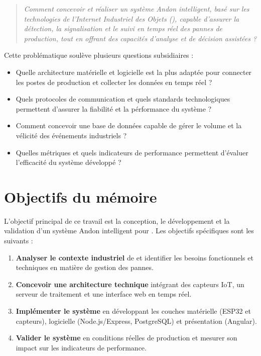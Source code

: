 \begin{quote}
\itshape Comment concevoir et r\'ealiser un syst\`eme Andon intelligent, bas\'e sur les technologies de l'Internet Industriel des Objets (\iiot), capable d'assurer la d\'etection, la signalisation et le suivi en temps r\'eel des pannes de production, tout en offrant des capacit\'es d'analyse et de d\'ecision assist\'ees ?
\end{quote}

Cette probl\'ematique soul\`eve plusieurs questions subsidiaires :
\begin{itemize}
    \item Quelle architecture mat\'erielle et logicielle est la plus adapt\'ee pour connecter les postes de production et collecter les donn\'ees en temps r\'eel ?
    \item Quels protocoles de communication et quels standards technologiques permettent d'assurer la fiabilit\'e et la p\'erformance du syst\`eme ?
    \item Comment concevoir une base de donn\'ees capable de g\'erer le volume et la v\'elicit\'e des \'ev\'enements industriels ?
    \item Quelles m\'etriques et quels indicateurs de performance permettent d'\'evaluer l'efficacit\'e du syst\`eme d\'evelopp\'e ?
\end{itemize}

\section{Objectifs du m\'emoire}

L'objectif principal de ce travail est la conception, le d\'eveloppement et la validation d'un syst\`eme Andon intelligent pour \sews. Les objectifs sp\'ecifiques sont les suivants :

\begin{enumerate}
    \item \textbf{Analyser le contexte industriel} de \sews et identifier les besoins fonctionnels et techniques en mati\`ere de gestion des pannes.
    \item \textbf{Concevoir une architecture technique} int\'egrant des capteurs IoT, un serveur de traitement et une interface web en temps r\'eel.
    \item \textbf{Impl\'ementer le syst\`eme} en d\'eveloppant les couches mat\'erielle (ESP32 et capteurs), logicielle (Node.js/Express, PostgreSQL) et pr\'esentation (Angular).
    \item \textbf{Valider le syst\`eme} en conditions r\'eelles de production et mesurer son impact sur les indicateurs de performance.
\end{enumerate}

